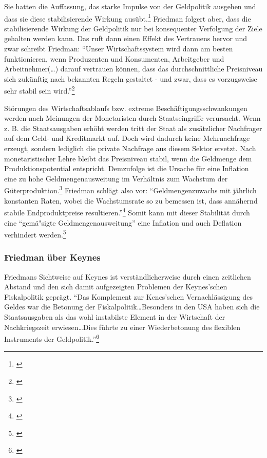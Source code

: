 \documentclass[
        onecolumn,
        a4paper,
        abstracton,
        parskip=half
        ,final
        ]{scrartcl}
\begin{document}
Sie hatten die Auffassung, das starke Impulse von der Geldpolitik ausgehen und
dass sie diese stabilisierende Wirkung aus{\"u}bt.\footnote[502]{\citep*[S.181]{bombach1981theorie}}
Friedman folgert aber, dass die stabilisierende Wirkung der Geldpolitik nur bei konsequenter Verfolgung der Ziele gehalten werden kann. Das ruft dann einen Effekt des Vertrauens
hervor und zwar schreibt Friedman: "`Unser Wirtschaftssystem wird dann am
besten funktionieren, wenn Produzenten und Konsumenten, Arbeitgeber und
Arbeitnehmer(\ldots) darauf vertrauen k{\"o}nnen, dass das durchschnittliche
Preisniveau sich zuk{\"u}nftig nach bekannten Regeln gestaltet - und zwar, dass
es vorzugsweise sehr stabil sein wird."'\footnote[503]{\citep*[vgl.][S.150]{friedman1970die}}

St{\"o}rungen des Wirtschaftsablaufs bzw. extreme Besch{\"a}ftigungsschwankungen werden nach Meinungen der Monetaristen durch Staatseingriffe verursacht. Wenn z. B. die Staatsausgaben erh{\"o}ht werden tritt der Staat als zus{\"a}tzlicher Nachfrager auf dem Geld- und Kreditmarkt auf. Doch wird dadurch keine Mehrnachfrage erzeugt, sondern lediglich die private Nachfrage aus diesem Sektor ersetzt. Nach monetaristischer Lehre bleibt das Preisniveau stabil, wenn die Geldmenge dem Produktionspotential entspricht. Demzufolge ist die Ursache f{\"u}r eine Inflation eine zu hohe Geldmengenausweitung im Verh{\"a}ltnis zum Wachstum der G{\"u}terproduktion.\footnote[504]{\citep*[vgl.][S.213]{peters2000}}
Friedman schl{\"a}gt also vor: "`Geldmengenzuwachs mit j{\"a}hrlich konstanten Raten, wobei die Wachstumsrate so zu bemessen ist, dass ann{\"a}hernd stabile Endproduktpreise resultieren."'\footnote[505]{\citep*[vgl.][S.132]{friedman1970die}} Somit kann mit dieser
Stabilit{\"a}t durch eine "`gem{\"a}{"s}igte Geldmengenausweitung"' eine Inflation und auch
Deflation verhindert werden.\footnote[506]{\citep*[vgl.][S.155]{friedman1970die}}

\subsubsection{Friedman {\"u}ber Keynes} %
Friedmans Sichtweise auf Keynes ist verst{\"a}ndlicherweise durch einen zeitlichen Abstand und den sich damit aufgezeigten Problemen der Keynes'schen Fiskalpolitik gepr{\"a}gt. "`Das Komplement zur Kenes'schen Vernachl{\"a}ssigung des Geldes war die Betonung der
Fiskalpolitik\ldots Besonders in den USA haben sich die Staatsausgaben als das wohl instabilste Element in der Wirtschaft der Nachkriegszeit erwiesen\ldots Dies f{\"u}hrte zu einer Wiederbetonung des flexiblen Instruments der Geldpolitik."'\footnote[801]{\citep*[S.105]{friedman1970die}}
\end{document}

